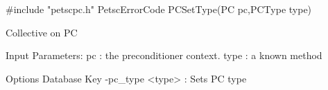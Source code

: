 #include "petscpc.h" 
PetscErrorCode  PCSetType(PC pc,PCType type)

Collective on PC

Input Parameters:
pc : the preconditioner context.
type : a known method

Options Database Key
-pc_type <type> : Sets PC type
